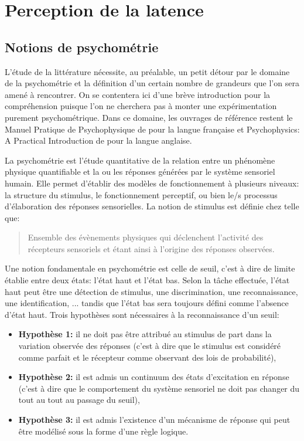 	\section{Perception de la latence}
	\subsection{Notions de psychométrie}
	\par L'étude de la littérature nécessite, au préalable, un petit détour par le domaine de la psychométrie et la définition d'un certain nombre de grandeurs que l'on sera amené à rencontrer. On se contentera ici d'une brève introduction pour la compréhension puisque l'on ne cherchera pas à monter une expérimentation purement psychométrique. Dans ce domaine, les ouvrages de référence restent le Manuel Pratique de Psychophysique de \citep{bonnet_manuel_1986} pour la langue française et Psychophysics: A Practical Introduction de \citep{kingdom_psychophysics:_2010} pour la langue anglaise.
	
	\par La psychométrie est l'étude quantitative de la relation entre un phénomène physique quantifiable et la ou les réponses générées par le système sensoriel humain. Elle permet d'établir des modèles de fonctionnement à plusieurs niveaux: la structure du stimulus, le fonctionnement perceptif, ou bien le/s processus d'élaboration des réponses sensorielles. La notion de stimulus est  définie chez \citep{bonnet_manuel_1986} telle que:
	\begin{quote}
		Ensemble des évènements physiques qui déclenchent l'activité des récepteurs sensoriels et étant ainsi à l'origine des réponses observées.
	\end{quote}
	
	\par Une notion fondamentale en psychométrie est celle de seuil, c'est à dire de limite établie entre deux états: l'état haut et l'état bas. Selon la tâche effectuée, l'état haut peut être une détection de stimulus, une discrimination, une reconnaissance, une identification, ... tandis que l'état bas sera toujours défini comme l'absence d'état haut. Trois hypothèses sont nécessaires à la reconnaissance d'un seuil:
	\begin{itemize}
		\item \textbf{Hypothèse 1:} il ne doit pas être attribué au stimulus de part dans la variation observée des réponses (c'est à dire que le stimulus est considéré comme parfait et le récepteur comme observant des lois de probabilité),
		\item \textbf{Hypothèse 2:} il est admis un continuum des états d'excitation en réponse (c'est à dire que le comportement du système sensoriel ne doit pas changer du tout au tout au passage du seuil),
		\item \textbf{Hypothèse 3:} il est admis l'existence d'un mécanisme de réponse qui peut être modélisé sous la forme d'une règle logique.
	\end{itemize}		
	
